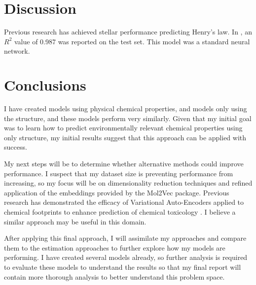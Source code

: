 \documentclass[12pt, oneside]{article}   	%
\begin{document}
\section{Discussion}

Previous research has achieved stellar performance predicting Henry's law. In \cite{English2021}, an $R^2$ value of 0.987 was reported on the test set. This model was a standard neural network.

\section{Conclusions}
I have created models using physical chemical properties, and models only using the structure, and these models perform very similarly. Given that my initial goal was to learn how to predict environmentally relevant chemical properties using only structure, my initial results suggest that this approach can be applied with success.

My next steps will be to determine whether alternative methods could improve performance. I suspect that my dataset size is preventing performance from increasing, so my focus will be on dimensionality reduction techniques and refined application of the embeddings provided by the Mol2Vec package. Previous research has demonstrated the efficacy of Variational Auto-Encoders applied to chemical footprints to enhance prediction of chemical toxicology \cite{RN106}. I believe a similar approach may be useful in this domain.

After applying this final approach, I will assimilate my approaches and compare them to the estimation approaches to further explore how my models are performing. I have created several models already, so further analysis is required to evaluate these models to understand the results so that my final report will contain more thorough analysis to better understand this problem space.
\end{document}

